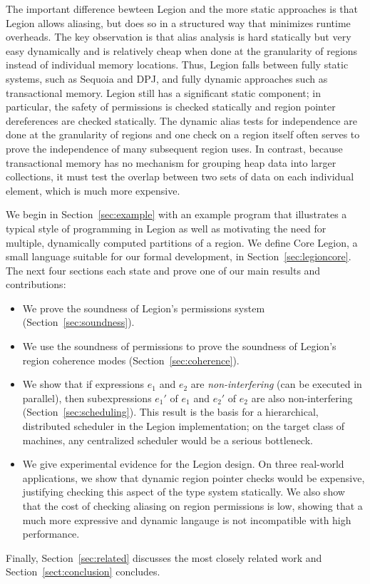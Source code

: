 The important difference bewteen Legion and the more static approaches
is that Legion allows aliasing, but does so in a structured way that minimizes
runtime overheads.  The key observation is that
alias analysis is hard statically but very easy dynamically and is relatively cheap
when done at the granularity of regions instead of individual memory
locations.  Thus, Legion falls between fully static systems, such as
Sequoia and DPJ, and fully dynamic approaches such as transactional
memory.  Legion still has a significant static component; in
particular, the safety of permissions is checked statically and region
pointer dereferences are checked statically.  The dynamic alias tests
for independence are done at the granularity of regions and one check on a region
itself often serves to prove the independence of many subsequent region
uses.  In contrast, because transactional memory has no mechanism
for grouping heap data into larger collections, it must test the
overlap between two sets of data on each individual element, which is
much more expensive.

We begin in Section~\ref{sec:example} with an example program that illustrates
a typical style of programming in Legion as well as motivating the need for multiple, dynamically computed  partitions of
a region.  We define Core Legion, a small language suitable for our formal development, in Section~\ref{sec:legioncore}.
The next four sections each state and prove one of our main results and contributions:
\begin{itemize}
\item We prove the soundness of Legion's permissions system (Section~\ref{sec:soundness}).

\item We use the soundness of permissions to prove the soundness of Legion's region coherence modes (Section~\ref{sec:coherence}).

\item We show that if expressions $e_1$ and $e_2$ are {\em non-interfering} (can be executed in parallel), then subexpressions
$e_1'$ of $e_1$ and $e_2'$ of $e_2$ are also non-interfering (Section~\ref{sec:scheduling}).  This result is the basis
for a hierarchical, distributed scheduler in the Legion implementation; on the target class of machines, any centralized
scheduler would be a serious bottleneck.

\item We give experimental evidence for the Legion design.  On three real-world applications, we show that 
dynamic region pointer checks would be expensive, justifying checking this aspect of the type system statically.
We also show that the cost of checking aliasing on region permissions is low, showing that a much more expressive
and dynamic langauge is not incompatible with high performance.

\end{itemize}
Finally, Section~\ref{sec:related} discusses the most closely related work and
Section~\ref{sect:conclusion} concludes.


  











